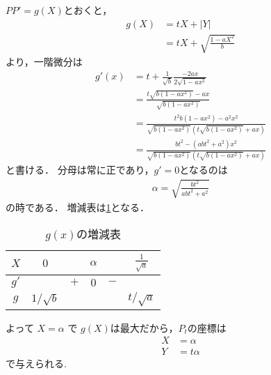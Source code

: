 \documentclass[a4paper,10pt]{ltjsarticle}
\begin{document}
\begin{multicols}{2}
  $PP' = g(X)$とおくと，
  \begin{align*}
    g(X)
     & = tX + |Y|                       \\
     & = tX + \sqrt{\frac{1 - aX^2}{b}}
  \end{align*}
  より，一階微分は
  \begin{align*}
    g'(x)
     & = t + \frac{1}{\sqrt{b}} \frac{-2ax}{2\sqrt{1-ax^2}}                              \\
     & = \frac{t\sqrt{b(1-ax^2)}-ax}{\sqrt{b(1-ax^2)}}                                   \\
     & = \frac{t^2b(1-ax^2)-a^2x^2}{\sqrt{b(1-ax^2)}\left(t\sqrt{b(1-ax^2)}+ax\right)}   \\
     & = \frac{bt^2 - (abt^2+a^2)x^2}{\sqrt{b(1-ax^2)}\left(t\sqrt{b(1-ax^2)}+ax\right)}
  \end{align*}
  と書ける．
  分母は常に正であり，$g'=0$となるのは
  \begin{align*}
    \alpha = \sqrt{\frac{bt^2}{abt^2 + a^2}}
  \end{align*}
  の時である．
  増減表は\cref{table:1}となる．
  \begin{table}[H]
    \centering
    \caption{$g(x)$の増減表}
    \label{table:1}
    \begin{tabular}{|c|c|c|c|c|c|}
      \hline
      $X$  & $0$          &     & $\alpha$ &     & $\frac{1}{\sqrt{a}}$ \\
      \hline
      $g'$ &              & $+$ & $0$      & $-$ &                      \\
      \hline
      $g$  & $1/\sqrt{b}$ &     &          &     & $t/\sqrt{a}$         \\
      \hline
    \end{tabular}
  \end{table}

  よって $X = \alpha$ で $g(X)$は最大だから，$P_t$の座標は
  \begin{align*}
    X & = \alpha  \\
    Y & = t\alpha
  \end{align*}
  で与えられる.


\end{multicols}
\end{document}
